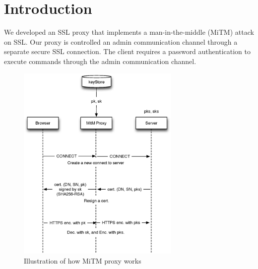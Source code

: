 
\usepackage{graphicx,amssymb,amsmath,enumerate}
\usepackage{courier}
\usepackage{color}
\usepackage{listings}
\usepackage{fancyvrb}
\usepackage{stmaryrd}

\oddsidemargin 0in
\evensidemargin 0in
\textwidth 6.5in
\topmargin -0.5in
\textheight 9.0in




\pagestyle{myheadings}  %

\section{Introduction}
We developed an SSL proxy that implements a man-in-the-middle (MiTM) attack on SSL. 
Our proxy is controlled an admin communication channel through a separate secure SSL connection. The client requires a password authentication to execute commands through the admin communication channel.

\begin{figure}[h!]
\centering
\includegraphics[width=0.7\textwidth]{proxy.eps}
\caption{Illustration of how MiTM proxy works}
\label{fig:diag}
\end{figure}


